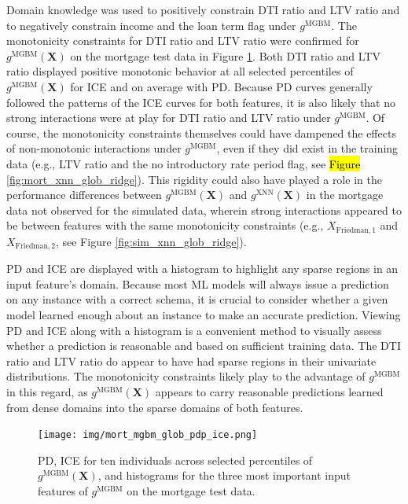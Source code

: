 \documentclass[information,article,accept,moreauthors,pdftex]{Definitions/mdpi}
\begin{document}
{{{Domain knowledge was used to positively constrain DTI ratio and LTV ratio and to negatively constrain income and the loan term flag under $g^\text{MGBM}$. The monotonicity constraints for DTI ratio and LTV ratio were confirmed for $g^\text{MGBM}(\mathbf{X})$ on the mortgage test data in Figure \ref{fig:mort_mgbm_glob_pdp_ice}. Both DTI ratio and LTV ratio displayed positive monotonic behavior at all selected percentiles of $g^\text{MGBM}(\mathbf{X})$ for ICE and on average with PD. Because PD curves generally followed the patterns of the ICE curves for both features, it is also likely that no strong interactions were at play for DTI ratio and LTV ratio under $g^\text{MGBM}$. Of course, the monotonicity constraints themselves could have dampened the effects of non-monotonic interactions under $g^\text{MGBM}$, even if they did exist in the training data (e.g., LTV ratio and the no introductory rate period flag, see\hl{ Figure} \ref{fig:mort_xnn_glob_ridge}). This rigidity could also have played a role in the performance differences between $g^\text{MGBM}(\mathbf{X})$ and $g^\text{XNN}(\mathbf{X})$ in the mortgage data not observed for the simulated data, wherein strong interactions appeared to be between features with the same monotonicity constraints (e.g., $X_{\text{Friedman},1}$ and $X_{\text{Friedman},2}$, see Figure \ref{fig:sim_xnn_glob_ridge}).%

PD and ICE are displayed with a histogram to highlight any sparse regions in an input feature's domain. Because most ML models will always issue a prediction on any instance with a correct schema, it is crucial to consider whether a given model learned enough about an instance to make an accurate prediction. Viewing PD and ICE along with a histogram is a convenient method to visually assess whether a prediction is reasonable and based on sufficient training data. The DTI ratio and LTV ratio do appear to have had sparse regions in their univariate distributions. The monotonicity constraints likely play to the advantage of $g^\text{MGBM}$ in this regard, as $g^\text{MGBM}(\mathbf{X})$ appears to carry reasonable predictions learned from dense domains into the sparse domains of both features. 

\begin{figure}[H]
\centering
 \texttt{[image: img/mort\_mgbm\_glob\_pdp\_ice.png]}
\caption{PD, ICE for ten individuals across selected percentiles of $g^\text{MGBM}(\mathbf{X})$, and histograms for the three most important input features of $g^\text{MGBM}$ on the mortgage test data.}
\label{fig:mort_mgbm_glob_pdp_ice}
\end{figure}   

}}}
\end{document}
